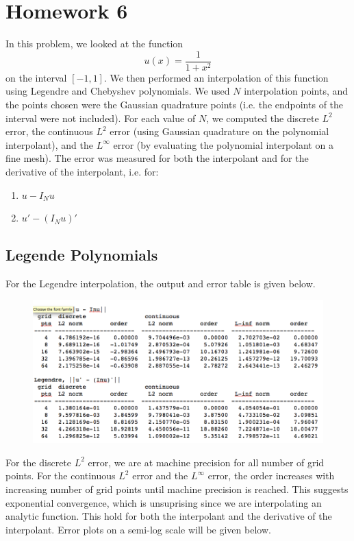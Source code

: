 \documentclass[12pt]{article}
\begin{document}
\section*{Homework 6}
In this problem, we looked at the function
\[
u(x) = \frac{1}{1 + x^2}
\]
on the interval $[-1, 1]$. We then performed an interpolation of this function using Legendre and Chebyshev polynomials. We used $N$ interpolation points, and the points chosen were the Gaussian quadrature points (i.e. the endpoints of the interval were not included). For each value of $N$, we computed the discrete $L^2$ error, the continuous $L^2$ error (using Gaussian quadrature on the polynomial interpolant), and the $L^\infty$ error (by evaluating the polynomial interpolant on a fine mesh). The error was measured for both the interpolant and for the derivative of the interpolant, i.e. for:
\begin{enumerate}
	\item $u - I_N u$
	\item $u' - (I_N u)'$
\end{enumerate}

\subsection*{Legende Polynomials}
For the Legendre interpolation, the output and error table is given below.

\begin{figure}[H]
\includegraphics[width=12cm]{images/legendre.png}
\end{figure}

For the discrete $L^2$ error, we are at machine precision for all number of grid points. For the continuous $L^2$ error and the $L^\infty$ error, the order increases with increasing number of grid points until machine precision is reached. This suggests exponential convergence, which is unsuprising since we are interpolating an analytic function. This hold for both the interpolant and the derivative of the interpolant. Error plots on a semi-log scale will be given below.
\end{document}
